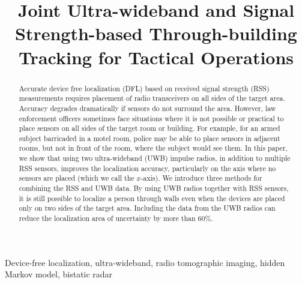 \documentclass[conference]{IEEEtran}
\begin{document}
\title{Joint Ultra-wideband and Signal Strength-based Through-building Tracking for Tactical Operations}



\author{
}





\maketitle

\thispagestyle{empty}

\begin{abstract}
  Accurate device free localization (DFL) based on received signal
  strength (RSS) measurements requires placement of radio transceivers
  on all sides of the target area.  Accuracy degrades dramatically if
  sensors do not surround the area.  However, law enforcement officers
  sometimes face situations where it is not possible or practical to
  place sensors on all sides of the target room or building. For
  example, for an armed subject barricaded in a motel room, police may
  be able to place sensors in adjacent rooms, but not in front of the
  room, where the subject would see them.  In this paper, we show that
  using two ultra-wideband (UWB) impulse radios, in addition to
  multiple RSS sensors, improves the localization accuracy,
  particularly on the axis where no sensors are placed (which we call
  the $x$-axis). We introduce three methods for combining the RSS and
  UWB data. By using UWB radios together with RSS sensors, it is still
  possible to localize a person through walls even when the devices
  are placed only on two sides of the target area. Including the data
  from the UWB radios can reduce the localization area of uncertainty
  by more than 60\%.
\end{abstract}

\begin{keywords}
Device-free localization, ultra-wideband, radio tomographic imaging, hidden Markov model, bistatic radar
\end{keywords}
\end{document}
